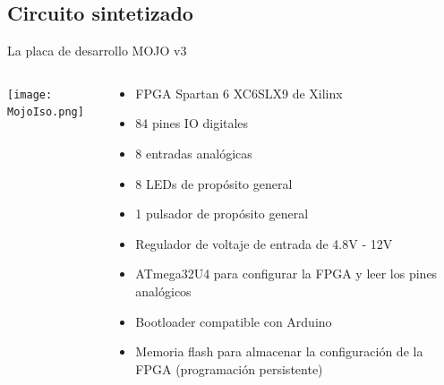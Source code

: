 \documentclass[11pt,a4paper]{beamer}
\begin{document}
		\subsection{Circuito sintetizado}
			\begin{frame}{La placa de desarrollo MOJO v3}
				\begin{columns}
					\begin{column}{.43\textwidth}
						\texttt{[image: MojoIso.png]}
					\end{column}
					\begin{column}{.55\textwidth}
						\begin{itemize}
							\item FPGA Spartan 6 XC6SLX9 de Xilinx
							\item 84 pines IO digitales
							\item 8 entradas analógicas
							\item 8 LEDs de propósito general
							\item 1 pulsador de propósito general
							\item Regulador de voltaje de entrada de 4.8V - 12V
							\item ATmega32U4 para configurar la FPGA y leer los pines analógicos
							\item Bootloader compatible con Arduino
							\item Memoria flash para almacenar la configuración de la FPGA (programación persistente)
						\end{itemize}
					\end{column}
				\end{columns}
			\end{frame}
\end{document}
